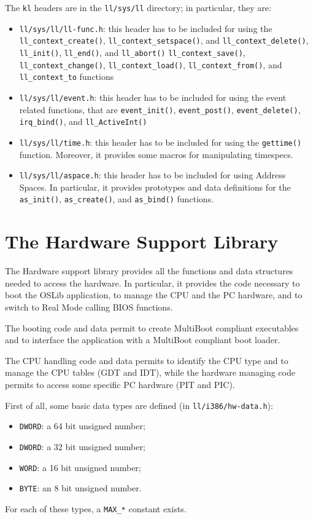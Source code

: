 \documentclass[a4paper]{report}
\begin{document}
The {\tt kl} headers are in the {\tt ll/sys/ll} directory; in particular,
they are:
\begin{itemize}
	\item {\tt ll/sys/ll/ll-func.h}: this header has to be included for
		using the {\tt ll\_context\_create()},
		{\tt ll\_context\_setspace()}, and {\tt ll\_context\_delete()},
		{\tt ll\_init()}, {\tt ll\_end()}, and {\tt ll\_abort()}
		{\tt ll\_context\_save()}, {\tt ll\_context\_change()},
		{\tt ll\_context\_load()}, {\tt ll\_context\_from()}, and
		{\tt ll\_context\_to} functions
	\item {\tt ll/sys/ll/event.h}: this header has to be included for
		using the event related functions, that are 
		{\tt event\_init()}, {\tt event\_post()},
		{\tt event\_delete()}, {\tt irq\_bind()}, and
		{\tt ll\_ActiveInt()}
	\item {\tt ll/sys/ll/time.h}: this header has to be included for
		using the {\tt gettime()} function. Moreover, it provides
		some macros for manipulating timespecs.
	\item {\tt ll/sys/ll/aspace.h}: this header has to be included for
		using Address Spaces. In particular, it provides prototypes
		and data definitions for the {\tt as\_init()},
		{\tt as\_create()}, and {\tt as\_bind()} functions.
\end{itemize}

\section{The Hardware Support Library}
The Hardware support library provides all the functions and data
structures needed to access the hardware. In particular, it provides
the code necessary to boot the OSLib application, to manage the CPU
and the PC hardware, and to switch to Real Mode calling BIOS functions.

The booting code and data permit to create MultiBoot compliant
executables and to interface the application with a MultiBoot compliant
boot loader.

The CPU handling code and data permits to identify the CPU type and to
manage the CPU tables (GDT and IDT), while the hardware managing code permits
to access some specific PC hardware (PIT and PIC).

First of all, some basic data types are defined (in {\tt ll/i386/hw-data.h}):
\begin{itemize}
	\item {\tt DWORD}: a 64 bit unsigned number;
	\item {\tt DWORD}: a 32 bit unsigned number;
	\item {\tt WORD}: a 16 bit unsigned number;
	\item {\tt BYTE}: an 8 bit unsigned number.
\end{itemize}
For each of these types, a {\tt MAX\_*} constant exists.
\end{document}
